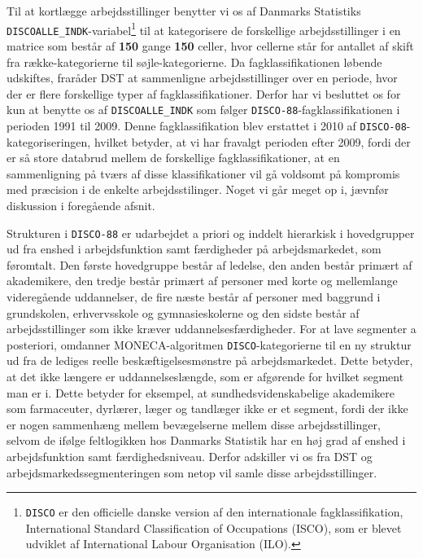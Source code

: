 Til at kortlægge arbejdsstillinger benytter vi os af Danmarks Statistiks \texttt{DISCOALLE\_INDK}-variabel\footnote{\texttt{DISCO} er den officielle danske version af den internationale fagklassifikation, International Standard Classification of Occupations (ISCO), som er blevet udviklet af International Labour Organisation (ILO).} til at kategorisere de forskellige arbejdsstillinger i en matrice som består af \textbf{150} gange \textbf{150} celler, hvor cellerne står for antallet af skift fra række-kategorierne til søjle-kategorierne. Da fagklassifikationen løbende udskiftes, fraråder DST at sammenligne arbejdsstillinger over en periode, hvor der er flere forskellige typer af fagklassifikationer. Derfor har vi besluttet os for kun at benytte os af \texttt{DISCOALLE\_INDK} som følger \texttt{DISCO-88}-fagklassifikationen i perioden 1991 til 2009. Denne fagklassifikation blev erstattet i 2010 af \texttt{DISCO-08}-kategoriseringen, hvilket betyder, at vi har fravalgt perioden efter 2009, fordi der er så store databrud mellem de forskellige fagklassifikationer, at en sammenligning på tværs af disse klassifikationer vil gå voldsomt på kompromis med præcision i de enkelte arbejdsstilinger. Noget vi går meget op i, jævnfør diskussion i foregående afsnit.

Strukturen i \texttt{DISCO-88} er udarbejdet a priori og inddelt hierarkisk i hovedgrupper ud fra enshed i arbejdsfunktion samt færdigheder på arbejdsmarkedet, som føromtalt. Den første hovedgruppe består af ledelse, den anden består  primært af akademikere, den tredje består primært af personer med korte og mellemlange videregående uddannelser, de fire næste består af personer med baggrund i grundskolen, erhvervsskole og gymnasieskolerne og den sidste består af arbejdsstillinger som ikke kræver uddannelsesfærdigheder. For at lave segmenter a posteriori, omdanner MONECA-algoritmen \texttt{DISCO}-kategorierne til en ny struktur ud fra de lediges reelle beskæftigelsesmønstre på arbejdsmarkedet. Dette betyder, at det ikke længere er uddannelseslængde, som er afgørende for hvilket segment man er i. Dette betyder for eksempel, at sundhedsvidenskabelige akademikere som farmaceuter, dyrlærer, læger og tandlæger ikke er et segment, fordi der ikke er nogen sammenhæng mellem bevægelserne mellem disse arbejdsstillinger, selvom de ifølge feltlogikken hos Danmarks Statistik har en høj grad af enshed i arbejdsfunktion samt færdighedsniveau. Derfor adskiller vi os fra DST og arbejdsmarkedssegmenteringen som netop vil samle disse arbejdsstillinger.

